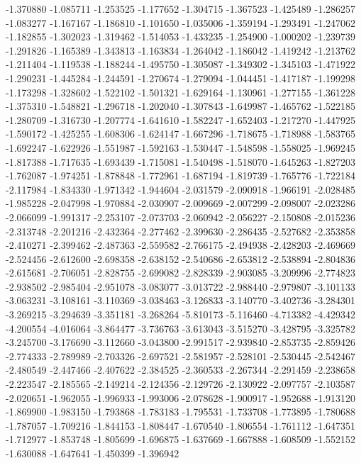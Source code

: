 -1.370880
-1.085711
-1.253525
-1.177652
-1.304715
-1.367523
-1.425489
-1.286257
-1.083277
-1.167167
-1.186810
-1.101650
-1.035006
-1.359194
-1.293491
-1.247062
-1.182855
-1.302023
-1.319462
-1.514053
-1.433235
-1.254900
-1.000202
-1.239739
-1.291826
-1.165389
-1.343813
-1.163834
-1.264042
-1.186042
-1.419242
-1.213762
-1.211404
-1.119538
-1.188244
-1.495750
-1.305087
-1.349302
-1.345103
-1.471922
-1.290231
-1.445284
-1.244591
-1.270674
-1.279094
-1.044451
-1.417187
-1.199298
-1.173298
-1.328602
-1.522102
-1.501321
-1.629164
-1.130961
-1.277155
-1.361228
-1.375310
-1.548821
-1.296718
-1.202040
-1.307843
-1.649987
-1.465762
-1.522185
-1.280709
-1.316730
-1.207774
-1.641610
-1.582247
-1.652403
-1.217270
-1.447925
-1.590172
-1.425255
-1.608306
-1.624147
-1.667296
-1.718675
-1.718988
-1.583765
-1.692247
-1.622926
-1.551987
-1.592163
-1.530447
-1.548598
-1.558025
-1.969245
-1.817388
-1.717635
-1.693439
-1.715081
-1.540498
-1.518070
-1.645263
-1.827203
-1.762087
-1.974251
-1.878848
-1.772961
-1.687194
-1.819739
-1.765776
-1.722184
-2.117984
-1.834330
-1.971342
-1.944604
-2.031579
-2.090918
-1.966191
-2.028485
-1.985228
-2.047998
-1.970884
-2.030907
-2.009669
-2.007299
-2.098007
-2.023286
-2.066099
-1.991317
-2.253107
-2.073703
-2.060942
-2.056227
-2.150808
-2.015236
-2.313748
-2.201216
-2.432364
-2.277462
-2.399630
-2.286435
-2.527682
-2.353858
-2.410271
-2.399462
-2.487363
-2.559582
-2.766175
-2.494938
-2.428203
-2.469669
-2.524456
-2.612600
-2.698358
-2.638152
-2.540686
-2.653812
-2.538894
-2.804836
-2.615681
-2.706051
-2.828755
-2.699082
-2.828339
-2.903085
-3.209996
-2.774823
-2.938502
-2.985404
-2.951078
-3.083077
-3.013722
-2.988440
-2.979807
-3.101133
-3.063231
-3.108161
-3.110369
-3.038463
-3.126833
-3.140770
-3.402736
-3.284301
-3.269215
-3.294639
-3.351181
-3.268264
-5.810173
-5.116460
-4.713382
-4.429342
-4.200554
-4.016064
-3.864477
-3.736763
-3.613043
-3.515270
-3.428795
-3.325782
-3.245700
-3.176690
-3.112660
-3.043800
-2.991517
-2.939840
-2.853735
-2.859426
-2.774333
-2.789989
-2.703326
-2.697521
-2.581957
-2.528101
-2.530445
-2.542467
-2.480549
-2.447466
-2.407622
-2.384525
-2.360533
-2.267344
-2.291459
-2.238658
-2.223547
-2.185565
-2.149214
-2.124356
-2.129726
-2.130922
-2.097757
-2.103587
-2.020651
-1.962055
-1.996933
-1.993006
-2.078628
-1.900917
-1.952688
-1.913120
-1.869900
-1.983150
-1.793868
-1.783183
-1.795531
-1.733708
-1.773895
-1.780688
-1.787057
-1.709216
-1.844153
-1.808447
-1.670540
-1.806554
-1.761112
-1.647351
-1.712977
-1.853748
-1.805699
-1.696875
-1.637669
-1.667888
-1.608509
-1.552152
-1.630088
-1.647641
-1.450399
-1.396942
